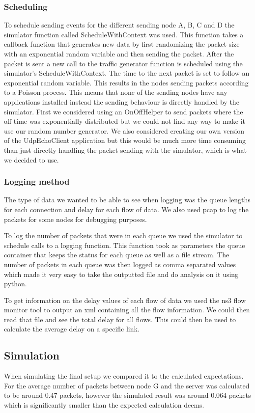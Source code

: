 \documentclass{article}
\begin{document}
\subsubsection{Scheduling}
To schedule sending events for the different sending node A, B, C and D the simulator function called ScheduleWithContext was used.
This function takes a callback function that generates new data by first randomizing the packet size with an exponential random variable and then sending the packet.
After the packet is sent a new call to the traffic generator function is scheduled using the simulator's ScheduleWithContext.
The time to the next packet is set to follow an exponential random variable.
This results in the nodes sending packets according to a Poisson process.
This means that none of the sending nodes have any applications installed instead the sending behaviour is directly handled by the simulator.
First we considered using an OnOffHelper to send packets where the off time was exponentially distributed but we could not find any way to make it use our random number generator.
We also considered creating our own version of the UdpEchoClient application but this would be much more time consuming than just directly handling the packet sending with the simulator, which is what we decided to use.

\subsubsection{Logging method}
The type of data we wanted to be able to see when logging was the queue lengths for each connection and delay for each flow of data.
We also used pcap to log the packets for some nodes for debugging purposes.

To log the number of packets that were in each queue we used the simulator to schedule calls to a logging function.
This function took as parameters the queue container that keeps the status for each queue as well as a file stream.
The number of packets in each queue was then logged as comma separated values which made it very easy to take the outputted file and do analysis on it using python.

To get information on the delay values of each flow of data we used the ns3 flow monitor tool to output an xml containing all the flow information.
We could then read that file and see the total delay for all flows.
This could then be used to calculate the average delay on a specific link.

\subsection{Simulation}
When simulating the final setup we compared it to the calculated expectations. For the average 
number of packets between node G and the server was calculated to be around 0.47 packets, 
however the simulated result was around 0.064 packets which is significantly smaller than the 
expected calculation deems. 
\end{document}
